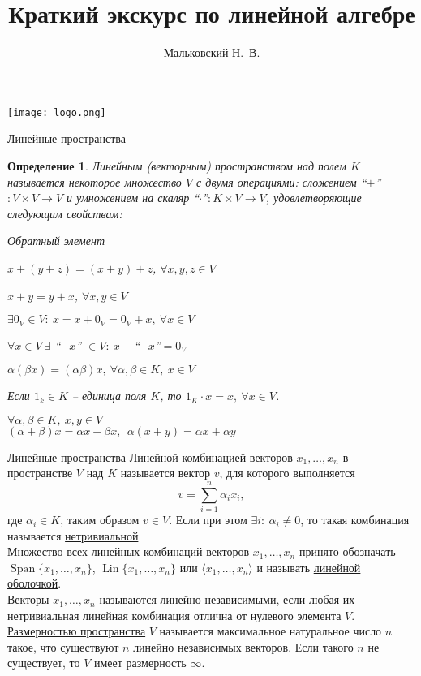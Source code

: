 \documentclass[10pt, handout]{beamer}
\author{Мальковский Н.~В.}
\title[Линейная алгебра]{Краткий экскурс по линейной алгебре}
\institute[СПбАУ]{Санкт-Петербургский Академический Университет}
\date{}
\DeclareMathOperator{\lin}{Span}
\DeclareMathOperator{\llin}{Lin}
\newcounter{def}
\newtheorem{definition_ru}{Определение}[def]
\begin{document}
\begin{frame}
\titlepage
\centering
\texttt{[image: logo.png]}\end{frame}

\begin{frame}{Линейные пространства}
\begin{definition_ru}
Линейным (векторным) пространством над полем $K$ называется некоторое множество $V$ с двумя операциями: сложением ``$+$''$:V\times V\rightarrow V$ и умножением на скаляр ``$\cdot$''$:K\times V\rightarrow V$, удовлетворяющие следующим свойствам:
\begin{labeling}{Обратный элемент}
\item[Ассоциативность] $x+(y+z)=(x+y)+z$, $\forall x,y,z\in V$
\item[Коммутативность] $x+y=y+x$, $\forall x,y\in V$
\item[Нулевой вектор] $\exists 0_V\in V:~x=x+0_V=0_V+x,~\forall x\in V$
\item[Обратный элемент] $\forall x\in V~\exists$ ``$-x$'' $\in V:~x+$``$-x$''$=0_V$
\item[Совместимость] $\alpha (\beta x)=(\alpha\beta)x,~\forall \alpha,\beta\in K,~x\in V$
\item[Унитарность] Если $1_k\in K$ -- единица поля $K$, то $1_K\cdot x=x,~\forall x\in V$.
\item[Дистрибутивность] $\forall \alpha,\beta\in K,~x,y\in V$ \\
$(\alpha+\beta)x=\alpha x+\beta x,~~\alpha(x+y)=\alpha x+\alpha y$
\end{labeling}
\end{definition_ru}
\end{frame}

\begin{frame}{Линейные пространства}
\underline{Линейной комбинацией} векторов $x_1,\ldots, x_n$ в пространстве $V$ над $K$ называется вектор $v$, для которого выполняется 
$$
v=\sum_{i=1}^n\alpha_i x_i,
$$
где $\alpha_i\in K$, таким образом $v\in V$. Если при этом $\exists i:~\alpha_i\neq 0$, то такая комбинация называется \underline{нетривиальной}\\
\pause
\vspace{1em}
Множество всех линейных комбинаций векторов $x_1,\ldots, x_n$ принято обозначать $\lin\{x_1, \ldots, x_n\}$, $\llin\{x_1, \ldots, x_n\}$ или $\langle x_1, \ldots, x_n\rangle$ и называть \underline{линейной оболочкой}.\\
\vspace{1em}
\pause
Векторы $x_1, \ldots, x_n$ называются \underline{линейно независимыми}, если любая их нетривиальная линейная комбинация отлична от нулевого элемента $V$.\\
\vspace{1em}
\pause
\underline{Размерностью пространства} $V$ называется максимальное натуральное число $n$ такое, что существуют $n$ линейно независимых векторов. Если такого $n$ не существует, то $V$ имеет размерность $\infty$.
\end{frame}
\end{document}
